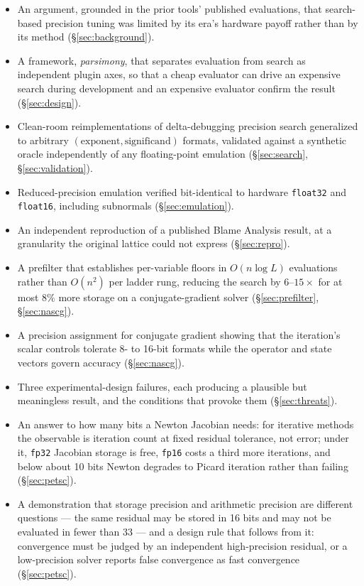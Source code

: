 \documentclass[11pt]{article}
\begin{document}
\begin{itemize}
  \item An argument, grounded in the prior tools' published evaluations, that
    search-based precision tuning was limited by its era's hardware payoff rather
    than by its method (\S\ref{sec:background}).
  \item A framework, \emph{parsimony}, that separates evaluation from search as
    independent plugin axes, so that a cheap evaluator can drive an expensive
    search during development and an expensive evaluator confirm the result
    (\S\ref{sec:design}).
  \item Clean-room reimplementations of delta-debugging precision search
    generalized to arbitrary $(\text{exponent}, \text{significand})$ formats,
    validated against a synthetic oracle independently of any floating-point
    emulation (\S\ref{sec:search}, \S\ref{sec:validation}).
  \item Reduced-precision emulation verified bit-identical to hardware
    \texttt{float32} and \texttt{float16}, including subnormals
    (\S\ref{sec:emulation}).
  \item An independent reproduction of a published Blame Analysis result, at a
    granularity the original lattice could not express
    (\S\ref{sec:repro}).
  \item A prefilter that establishes per-variable floors in $O(n \log L)$
    evaluations rather than $O(n^2)$ per ladder rung, reducing the search by
    $6$--$15\times$ for at most $8\%$ more storage on a conjugate-gradient solver
    (\S\ref{sec:prefilter}, \S\ref{sec:nascg}).
  \item A precision assignment for conjugate gradient showing that the
    iteration's scalar controls tolerate 8- to 16-bit formats while the operator
    and state vectors govern accuracy (\S\ref{sec:nascg}).
  \item Three experimental-design failures, each producing a plausible but
    meaningless result, and the conditions that provoke them
    (\S\ref{sec:threats}).
  \item An answer to how many bits a Newton Jacobian needs: for iterative
    methods the observable is iteration count at fixed residual tolerance, not
    error; under it, \texttt{fp32} Jacobian storage is free, \texttt{fp16} costs
    a third more iterations, and below about 10 bits Newton degrades to Picard
    iteration rather than failing (\S\ref{sec:petsc}).
  \item A demonstration that storage precision and arithmetic precision are
    different questions --- the same residual may be stored in 16 bits and may
    not be evaluated in fewer than 33 --- and a design rule that follows from
    it: convergence must be judged by an independent high-precision residual, or
    a low-precision solver reports false convergence as fast convergence
    (\S\ref{sec:petsc}).
\end{itemize}
\end{document}
